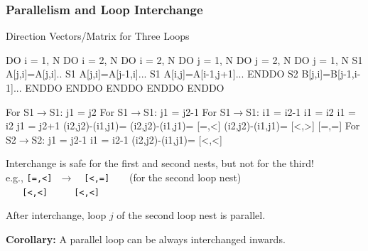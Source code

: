 \documentclass{beamer}
\renewcommand{\emph}[1]{\textcolor{structure}{#1}}
\newcommand{\emp}[1]{\textcolor{DikuRed}{ #1}}
\newcommand{\mymath}[1]{$ #1 $}
\begin{document}
\begin{frame}[fragile,t]
  \frametitle{Parallelism and Loop Interchange} %

\begin{block}{Direction Vectors/Matrix for Three Loops }
\begin{colorcode}
  DO i = 1, N            DO i = 2, N               DO i = 2, N
    DO j = 1, N            DO j = 2, N               DO j = 1, N 
S1    A[j,i]=A[j,i]..  S1   A[j,i]=A[j-1,i]...   S1    A[i,j]=A[i-1,j+1]...
    ENDDO              S2   B[j,i]=B[j-1,i-1]...     ENDDO
  ENDDO                  ENDDO ENDDO               ENDDO

For S1\mymath{\rightarrow}S1: j1 = j2    For S1\mymath{\rightarrow}S1: j1 = j2-1          For S1\mymath{\rightarrow}S1: i1 = i2-1
            i1 = i2                i1 = i2                    j1 = j2+1
(i2,j2)-(i1,j1)=         (i2,j2)-(i1,j1)=\emp{[=,<]}        (i2,j2)-(i1,j1)=\emp{[<,>]}
\emp{[=,=]}                  For S2\mymath{\rightarrow}S2: j1 = j2-1
                                   i1 = i2-1
                         (i2,j2)-(i1,j1)=\emp{[<,<]}
\end{colorcode}
\end{block} 

Interchange is safe for the first and second nests, but not for the third!\\
e.g., \emp{\tt [=,<]}$~~~\rightarrow~~~$ \emph{\tt [<,=]}$~~~~~~~~~$(for the second loop nest)\\
$~~~~~~$\emp{\tt [<,<]}$~~~~~~~~~~~~$\emph{\tt [<,<]}

\smallskip

After interchange, loop $j$ of the second loop nest is parallel.

\bigskip

{\bf Corollary:} A parallel loop can be always interchanged inwards.
\end{frame}
\end{document}
